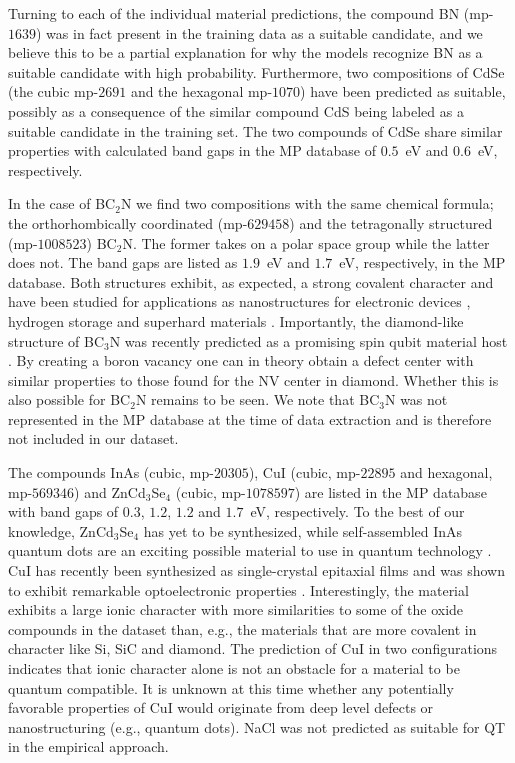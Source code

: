 \documentclass[superscriptaddress,unsortedaddress,
 amsmath,amssymb,
 aps,
]{revtex4-2}
\begin{document}
Turning to each of the individual material predictions, the compound BN (mp-$1639$) was in fact present in the training data as a suitable candidate, and we believe this to be a partial explanation for why the models recognize BN as a suitable candidate with high probability. Furthermore, two compositions of CdSe (the cubic mp-$2691$ and the hexagonal mp-$1070$) have been predicted as suitable, possibly as a consequence of the similar compound CdS being labeled as a suitable candidate in the training set. 
The two compounds of CdSe share similar properties with calculated band gaps in the MP database of $0.5$~eV and $0.6$~eV, respectively. 

In the case of BC$_2$N we find two compositions with the same chemical formula; the orthorhombically coordinated (mp-$629458$) and the tetragonally structured (mp-$1008523$) BC$_2$N. The former takes on a polar space group while the latter does not. The band gaps are listed as $1.9$~eV and $1.7$~eV, respectively, in the MP database. Both structures exhibit, as expected, a strong covalent character and have been studied for applications as nanostructures for electronic devices \cite{Gao2017}, hydrogen storage \cite{Cai2017} and superhard materials \cite{Li2017, Jiang2020}. Importantly, the diamond-like structure of BC$_3$N was recently predicted as a promising  spin qubit material host \cite{Wang2020SpinQB}. By creating a boron vacancy one can in theory obtain a defect center with similar properties to those found for the NV center in diamond. Whether this is also possible for BC$_2$N remains to be seen. We note that BC$_3$N was not represented in the MP database at the time of data extraction and is therefore not included in our dataset. 

The compounds InAs (cubic, mp-$20305$), CuI (cubic, mp-$22895$ and hexagonal, mp-$569346$) and ZnCd$_3$Se$_4$ (cubic, mp-$1078597$) are listed in the MP database with band gaps of $0.3$, $1.2$, $1.2$ and $1.7$~eV, respectively. 
To the best of our knowledge, ZnCd$_3$Se$_4$ has yet to be synthesized, while self-assembled InAs quantum dots are an exciting possible material to use in quantum technology \cite{Liu2018}. 
CuI has recently been synthesized as single-crystal epitaxial films and was shown to exhibit remarkable optoelectronic properties \cite{Ahn2020}. Interestingly, the material exhibits a large ionic character with more similarities to some of the oxide compounds in the dataset than, e.g., the materials that are more covalent in character like Si, SiC and  diamond.  
The prediction of CuI in two configurations indicates that ionic character alone is not an obstacle for a material to be quantum compatible. It is unknown at this time whether any potentially favorable properties of CuI would originate from deep level defects or  nanostructuring (e.g., quantum dots). NaCl was not predicted as suitable for QT in the empirical approach.  
\end{document}
